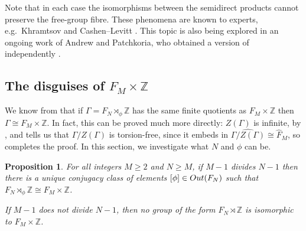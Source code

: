 \documentclass[11pt, a4 paper]{amsart}
\numberwithin{equation}{section}
\newtheorem{proposition}[theorem]{Proposition}
\theoremstyle{remark}
\theoremstyle{definition}
\def\Z{\mathbb Z}
\def\G{\Gamma}
\def\wh{\widehat}
\def\outN{{\rm{Out}}(F_N)}
\def\G{\Gamma}
\begin{document}
Note that in each case 
the isomorphisms between the semidirect products 
cannot preserve the free-group fibre. These phenomena are
known to experts, e.g.~Khramtsov \cite{khramtsov} and Cashen--Levitt \cite{cashenlevitt}. 
This topic is also being explored in an ongoing work of Andrew and Patchkoria, 
who obtained a version of  independently \cite{AP}. 

\subsection{The disguises of $F_M\times\Z$}
\label{s:FxZ}

We know from  that 
if $\G=F_N\rtimes_\phi\Z$ has the same finite quotients as $F_M\times\Z$
then $\G\cong F_M\times\Z$. 
In fact, this can be proved much more directly: 
$Z(\G)$ is infinite, by , 
and  tells us that $\G/Z(\G)$ is torsion-free, 
since it embeds in $\wh{\G/Z(\G)}\cong \wh{F}_M$, so
 completes the proof. 
In this section, we investigate what $N$ and $\phi$ can be.  

\begin{proposition}
\label{p:alg-version}
	For all integers $M\ge 2$ and $N\ge M$, 
	if $M-1$ divides $N-1$ 
	then there is a unique conjugacy class of elements $[\phi]\in\outN$ 
	such that $F_N\rtimes_{\phi}\Z\cong F_M\times\Z$.
	
	If $M-1$ does not divide $N-1$, 
	then no group of the form $F_N\rtimes\Z$ 
	is isomorphic to $F_M\times\Z$. 
\end{proposition}
\end{document}
